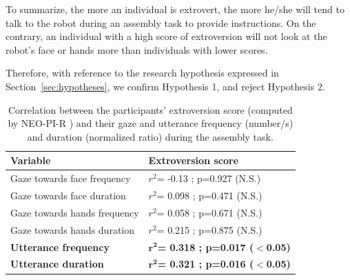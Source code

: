 \documentclass[twocolumn]{svjour3}          %
\begin{document}
To summarize, the more an individual is extrovert, the more he/she will tend to talk to the robot during an assembly task to provide instructions. 
On the contrary, an individual with a high score of extroversion will not look at the robot's face or hands more than individuals with lower scores.

Therefore, with reference to the research hypothesis expressed in Section~\ref{sec:hypotheses}, we confirm Hypothesis 1, and reject Hypothesis 2.


\begin{table}
\centering
\begin{tabular}{|p{6cm}|p{4.5cm}|}
\hline
Variable & \textbf{Extroversion score}  \\
\hline
\hline
Gaze towards face frequency  & $r^2$= -0.13 ; p=0.927 (N.S.)  \\
Gaze towards face duration  & $r^2$= 0.098 ; p=0.471 (N.S.) \\
\hline
Gaze towards hands frequency  & $r^2$= 0.058 ; p=0.671 (N.S.)  \\
Gaze towards hands duration  & $r^2$= 0.215 ; p=0.875 (N.S.) \\
\hline
\textbf{Utterance frequency}  &	\textbf{$\mathbf{r^2}$= 0.318 ; p=0.017 ($\mathbf{<}$0.05)}  \\
\textbf{Utterance duration} &	\textbf{$\mathbf{r^2}$= 0.321 ; p=0.016 ($\mathbf{<}$0.05)}  \\
\hline
\end{tabular}
\caption{Correlation between the participants' extroversion score (computed by NEO-PI-R \cite{NEOPIR1998}) and their gaze and utterance frequency (number/s) and duration (normalized ratio) during the assembly task.}
\label{table:extroversion}
\end{table}
\end{document}
